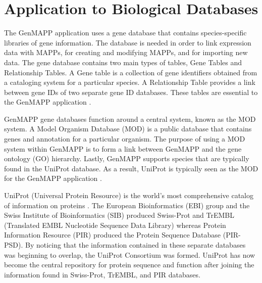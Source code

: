 \section{Application to Biological Databases}
\label{biodb}
The GenMAPP application uses a gene database that contains species-specific 
libraries of gene information.  The database is needed in order to link expression
data with MAPPs, for creating and modifying MAPPs, and for importing new data.  
The gene database contains two main types of tables, Gene Tables and Relationship 
Tables.  A Gene table is a collection of gene identifiers obtained from a 
cataloging system for a particular species.  A Relationship Table provides a link 
between gene IDs of two separate gene ID databases.  These tables are essential to
the GenMAPP application \cite{noSupport}.  

GenMAPP gene databases function around a central system, known as the MOD system.  
A Model Organism Database (MOD) is a public database that contains genes and 
annotation for a particular organism.  
The purpose of using a MOD system within GenMAPP is to form a link between
GenMAPP and the gene ontology (GO) hierarchy.  
Lastly, GenMAPP supports species that are typically
found in the UniProt database.  As a result, UniProt is typically seen as the MOD
for the GenMAPP application \cite{noSupport}.  

UniProt (Universal Protein Resource) is the world's most comprehensive catalog of 
information on proteins \cite{uniprotWeb}.  
The European Bioinformatics (EBI) group and the
Swiss Institute of Bioinformatics (SIB) produced Swiss-Prot and TrEMBL 
(Translated EMBL Nucleotide Sequence Data Library)
whereas 
Protein Information Resource (PIR) produced the Protein Sequence Database (PIR-PSD).  
By noticing that the information contained in these separate databases was beginning
to overlap, the UniProt Consortium was formed.  
UniProt has now become the central repository 
for protein sequence and function after joining the information found in 
Swiss-Prot, TrEMBL, and PIR databases.  

